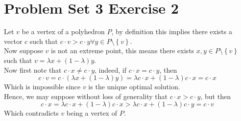 \documentclass[11pt, a4paper]{article}
\begin{document}
\section{Problem Set 3 Exercise 2}
Let $v$ be a vertex of a polyhedron $P$, by definition this implies there exists a vector $c$ such that $c\cdot v > c\cdot y \forall y \in P \setminus \left\{ v \right\} $.\\
Now suppose $v$ is not an extreme point, this means there exists $x,y\in P\setminus \left\{ v \right\} $ such that $ v = \lambda x + ( 1-\lambda) y$.\\
Now first note that $c\cdot x \neq c\cdot y$, indeed, if $c\cdot x = c\cdot y$, then
\[ 
c\cdot v = c\cdot ( \lambda x+ ( 1-\lambda) y) = \lambda c\cdot x + ( 1-\lambda) c\cdot x = c\cdot x
\]
Which is impossible since $v$ is the unique optimal solution.\\
Hence, we may suppose without loss of generality that $c\cdot x >c\cdot y$, but then
\[ 
c\cdot x= \lambda c \cdot x + ( 1-\lambda) c\cdot x > \lambda c\cdot x + ( 1-\lambda) c\cdot y = c\cdot v
\]
Which contradicts $v$ being a vertex of $P$.\\
\end{document}
